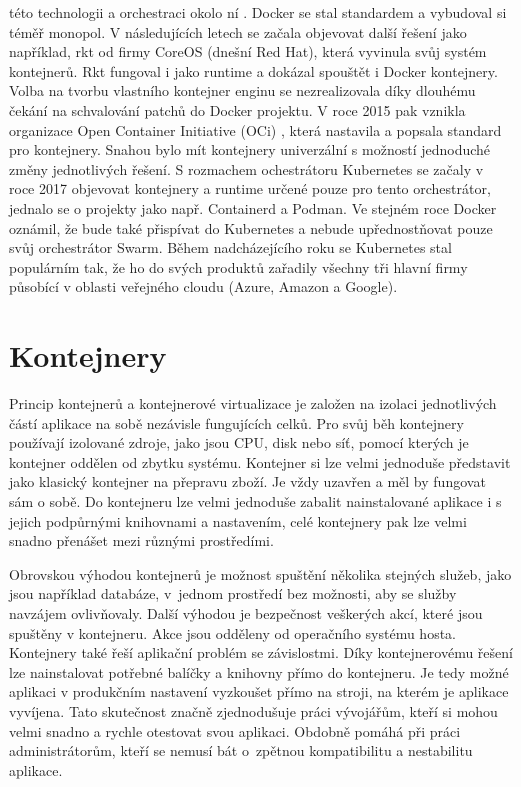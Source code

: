 této technologii a orchestraci okolo ní \cite{docker_rename}. Docker se stal standardem a vybudoval si téměř monopol. V následujících letech se začala objevovat další řešení jako například, rkt od firmy CoreOS (dnešní Red Hat), která vyvinula svůj systém kontejnerů. Rkt fungoval i jako runtime a dokázal spouštět i Docker kontejnery. Volba na tvorbu vlastního kontejner enginu se nezrealizovala díky dlouhému čekání na schvalování patchů do Docker projektu. V roce 2015 pak vznikla organizace Open Container Initiative (OCi) \cite{OCI_standard}, která nastavila a popsala standard pro kontejnery. Snahou bylo mít kontejnery univerzální s možností jednoduché změny jednotlivých řešení. S rozmachem ochestrátoru Kubernetes se začaly v roce 2017 objevovat kontejnery a runtime určené pouze pro tento orchestrátor, jednalo se o projekty jako např. Containerd a Podman. Ve stejném roce Docker oznámil, že bude také přispívat do Kubernetes a nebude upřednostňovat pouze svůj orchestrátor Swarm. Během nadcházejícího roku se Kubernetes stal populárním tak, že ho do svých produktů zařadily všechny tři hlavní firmy působící v oblasti veřejného cloudu (Azure, Amazon a Google).

\section{Kontejnery}
Princip kontejnerů a kontejnerové virtualizace je založen na izolaci jednotlivých částí aplikace na sobě nezávisle fungujících celků. Pro svůj běh kontejnery používají izolované zdroje, jako jsou CPU, disk nebo síť, pomocí kterých je kontejner oddělen od zbytku systému. Kontejner si lze velmi jednoduše představit jako klasický kontejner na přepravu zboží. Je vždy uzavřen a měl by fungovat sám o sobě. Do kontejneru lze velmi jednoduše zabalit nainstalované aplikace i s jejich podpůrnými knihovnami a nastavením, celé kontejnery pak lze velmi snadno přenášet mezi různými prostředími.

Obrovskou výhodou kontejnerů je možnost spuštění několika stejných služeb, jako jsou například databáze, v jednom prostředí bez možnosti, aby se služby navzájem ovlivňovaly. Další výhodou je bezpečnost veškerých akcí, které jsou spuštěny v kontejneru. Akce jsou odděleny od operačního systému hosta. Kontejnery také řeší aplikační problém se závislostmi. Díky kontejnerovému řešení lze nainstalovat potřebné balíčky a knihovny přímo do kontejneru. Je tedy možné aplikaci v produkčním nastavení vyzkoušet přímo na stroji, na kterém je aplikace vyvíjena. Tato skutečnost značně zjednodušuje práci vývojářům, kteří si mohou velmi snadno a rychle otestovat svou aplikaci. Obdobně pomáhá při práci administrátorům, kteří se nemusí bát o zpětnou kompatibilitu a nestabilitu aplikace.

